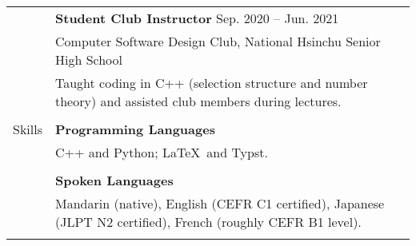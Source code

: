 \documentclass[letterpaper, 11pt]{article}
\begin{document}
\begin{center}
\begin{longtable}{p{0.76in}p{5.93in}}
        & \textbf{Student Club Instructor} \hfill Sep. 2020 -- Jun. 2021 \\
        & Computer Software Design Club, National Hsinchu Senior High School\\
        & Taught coding in C++ (selection structure and number theory) and assisted club members during lectures.\\
        & \\

        
        {\textcolor{OliveGreen}{Skills}} 
        & \textbf{Programming Languages}\\
        & C++ and Python; \LaTeX\ and Typst.\\
        & \\

        & \textbf{Spoken Languages} \\
        & Mandarin (native), English (CEFR C1 certified), Japanese (JLPT N2 certified), French (roughly CEFR B1 level).\\
        & \\


        
        
    \end{longtable}
\end{center}
\end{document}

